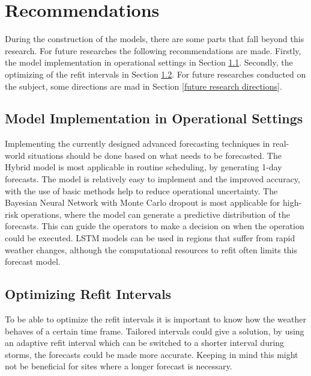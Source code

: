 \chapter{Recommendations}
During the construction of the models, there are some parts that fall beyond this research. For future researches the following recommendations are made. Firstly, the model implementation in operational settings in Section \ref{model implementation in operational settings}. Secondly, the optimizing of the refit intervals in Section \ref{optimizing refit intervals}. For future researches conducted on the subject, some directions are mad in Section \ref{future research directions}. 

\section{Model Implementation in Operational Settings}
\label{model implementation in operational settings}
Implementing the currently designed advanced forecasting techniques in real-world situations should be done based on what needs to be forecasted. The Hybrid model is most applicable in routine scheduling, by generating 1-day forecasts. The model is relatively easy to implement and the improved accuracy, with the use of basic methods help to reduce operational uncertainty. The Bayesian Neural Network with Monte Carlo dropout is most applicable for high-risk operations, where the model can generate a predictive distribution of the forecasts. This can guide the operators to make a decision on when the operation could be executed. LSTM models can be used in regions that suffer from rapid weather changes, although the computational resources to refit often limits this forecast model.

\section{Optimizing Refit Intervals}
\label{optimizing refit intervals}
To be able to optimize the refit intervals it is important to know how the weather behaves of a certain time frame. Tailored intervals could give a solution, by using an adaptive refit interval which can be switched to a shorter interval during storms, the forecasts could be made more accurate. Keeping in mind this might not be beneficial for sites where a longer forecast is necessary.\\

